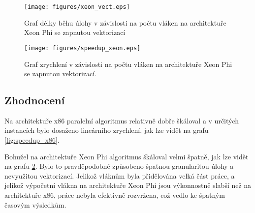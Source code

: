 \documentclass[12pt]{article}
\begin{document}
\begin{figure}[!h]
	\centering
    \texttt{[image: figures/xeon\_vect.eps]}
    \caption{Graf délky běhu úlohy v závislosti na počtu vláken na architektuře Xeon Phi se zapnutou vektorizací}
    \label{fig:xeon_vect}
\end{figure}

\begin{figure}[!h]
	\centering
    \texttt{[image: figures/speedup\_xeon.eps]}
    \caption{Graf zrychlení v závislosti na počtu vláken na architektuře Xeon Phi se zapnutou vektorizací.}
    \label{fig:speedup_xeon}
\end{figure}

\clearpage
\subsection{Zhodnocení}
Na architektuře x86 paralelní algoritmus relativně dobře škáloval a v určitých instancích bylo dosaženo lineárního zrychlení, jak lze vidět na grafu \ref{fig:speedup_x86}. \par
Bohužel na architektuře Xeon Phi algoritmus škáloval velmi špatně, jak lze vidět na grafu \ref{fig:speedup_xeon}. Bylo to pravděpodobně způsobeno špatnou granularitou úlohy a nevyužitou vektorizací. Jelikož vláknům byla přidělována velká část práce, a jelikož výpočetní vlákna na architektuře Xeon Phi jsou výkonnostně slabší než na architektuře x86, práce nebyla efektivně rozvržena, což vedlo ke špatným časovým výsledkům. 
\appendix
\end{document}
